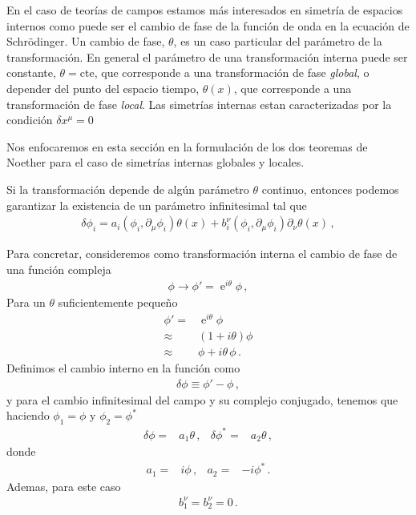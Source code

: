 En el caso de teorías de campos estamos más interesados en simetría de espacios internos como puede ser el cambio de fase de la función de onda en la ecuación de Schrödinger. Un cambio de fase, $\theta$, es un caso particular del parámetro de la transformación. En general el parámetro de una transformación interna puede ser constante, $\theta=\text{cte}$, que corresponde a una transformación de fase  \emph{global}, o depender del punto del espacio tiempo, $\theta(x)$, que corresponde  a una transformación  de fase \emph{local}. Las simetrías internas estan caracterizadas por la condición $\delta x^\mu=0$ 

Nos enfocaremos en esta sección en la formulación de los dos teoremas de Noether para el caso de simetrías internas globales y locales.   


Si la transformación depende de algún parámetro $\theta$ continuo, entonces podemos garantizar la existencia de un parámetro infinitesimal tal que
\begin{align}
\label{eq:infdt}
 \delta\phi_i= a_{i}\left( \phi_{i},\partial_{\mu}\phi_{i} \right) \theta(x)+b^{\nu}_i \left( \phi_{i},\partial_{\mu}\phi_{i} \right) \partial_{\nu}\theta(x)\,,
\end{align}

Para concretar, consideremos como transformación interna el cambio de fase de una función compleja
\begin{align}
  \phi\to \phi'=\operatorname{e}^{i\theta}\phi\,,  
\end{align}
Para un $\theta$ suficientemente pequeño
\begin{align}
  \phi'=&\operatorname{e}^{i\theta}\phi \nonumber\\
    \approx&(1+i \theta)\phi \nonumber\\
    \approx&\phi+i \theta\, \phi\,.
\end{align}
Definimos el cambio interno en la función como
\begin{align}
  \delta\phi\equiv \phi'-\phi\,,
\end{align}
y para el cambio infinitesimal del campo y su complejo conjugado, tenemos que haciendo $\phi_1=\phi$ y $\phi_2=\phi^{*}$
\begin{align}
  \delta\phi=&a_1 \theta\,, &  \delta\phi^{*}=&  a_2 \theta\,, 
\end{align}
donde
\begin{align}
  a_1=& i\phi \,, & a_2=&-i\phi^{*}\,.
\end{align}
Ademas, para este caso
\begin{align}
  b_1^\nu=b_2^\nu=0\,.
\end{align}




